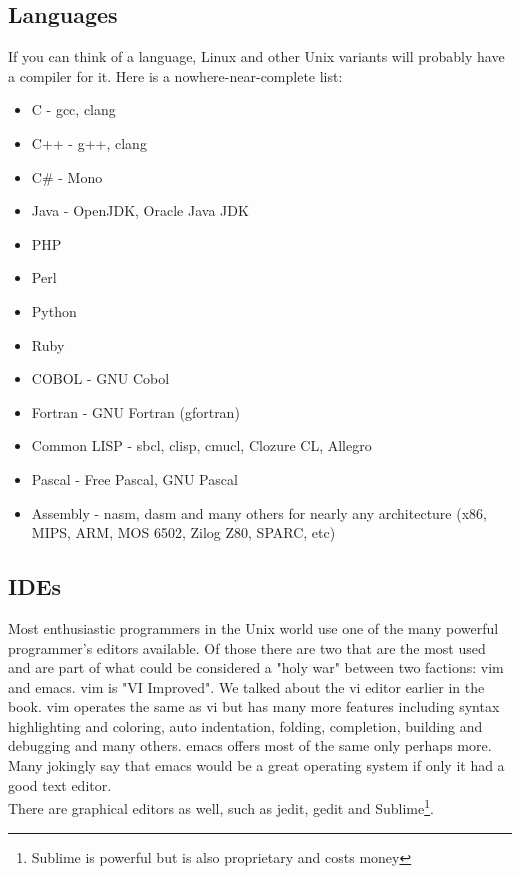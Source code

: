 \subsection{Languages}

If you can think of a language, Linux and other Unix variants will probably have a compiler for it.  Here is a nowhere-near-complete list:

\begin{itemize}
\item C - gcc, clang
\item C++ - g++, clang
\item C\# - Mono
\item Java - OpenJDK, Oracle Java JDK
\item PHP
\item Perl
\item Python
\item Ruby
\item COBOL - GNU Cobol
\item Fortran - GNU Fortran (gfortran)
\item Common LISP - sbcl, clisp, cmucl, Clozure CL, Allegro
\item Pascal - Free Pascal, GNU Pascal
\item Assembly - nasm, dasm and many others for nearly any architecture (x86, MIPS, ARM, MOS 6502, Zilog Z80, SPARC, etc)
\end{itemize}

\subsection{IDEs}

Most enthusiastic programmers in the Unix world use one of the many powerful programmer's editors available.  Of those there are two that are the most used and are part of what could be considered a "holy war" between two factions: vim and emacs.  vim is "VI Improved".  We talked about the vi editor earlier in the book.  vim operates the same as vi but has many more features including syntax highlighting and coloring, auto indentation, folding, completion, building and debugging and many others.  emacs offers most of the same only perhaps more.  Many jokingly say that emacs would be a great operating system if only it had a good text editor.\\

There are graphical editors as well, such as jedit, gedit and Sublime\footnote{Sublime is powerful but is also proprietary and costs money}.\\

